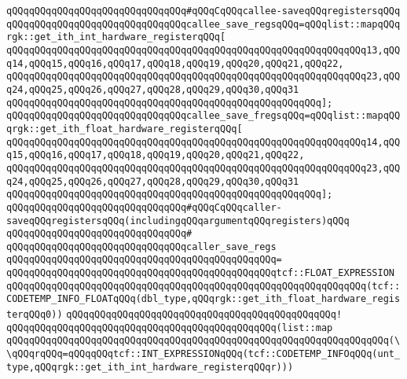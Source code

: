 \newline
\verb|qQQqqQQqqQQqqQQqqQQqqQQqqQQqqQQq#qQQqCqQQqcallee-saveqQQqregistersqQQq|\newline
\verb|qQQqqQQqqQQqqQQqqQQqqQQqqQQqqQQqcallee_save_regsqQQq=qQQqlist::mapqQQqrgk::get_ith_int_hardware_registerqQQq[|\newline
\verb|qQQqqQQqqQQqqQQqqQQqqQQqqQQqqQQqqQQqqQQqqQQqqQQqqQQqqQQqqQQqqQQq13,qQQq14,qQQq15,qQQq16,qQQq17,qQQq18,qQQq19,qQQq20,qQQq21,qQQq22,|\newline
\verb|qQQqqQQqqQQqqQQqqQQqqQQqqQQqqQQqqQQqqQQqqQQqqQQqqQQqqQQqqQQqqQQq23,qQQq24,qQQq25,qQQq26,qQQq27,qQQq28,qQQq29,qQQq30,qQQq31|\newline
\verb|qQQqqQQqqQQqqQQqqQQqqQQqqQQqqQQqqQQqqQQqqQQqqQQqqQQqqQQq];|\newline
\verb|qQQqqQQqqQQqqQQqqQQqqQQqqQQqqQQqcallee_save_fregsqQQq=qQQqlist::mapqQQqrgk::get_ith_float_hardware_registerqQQq[|\newline
\verb|qQQqqQQqqQQqqQQqqQQqqQQqqQQqqQQqqQQqqQQqqQQqqQQqqQQqqQQqqQQqqQQq14,qQQq15,qQQq16,qQQq17,qQQq18,qQQq19,qQQq20,qQQq21,qQQq22,|\newline
\verb|qQQqqQQqqQQqqQQqqQQqqQQqqQQqqQQqqQQqqQQqqQQqqQQqqQQqqQQqqQQqqQQq23,qQQq24,qQQq25,qQQq26,qQQq27,qQQq28,qQQq29,qQQq30,qQQq31|\newline
\verb|qQQqqQQqqQQqqQQqqQQqqQQqqQQqqQQqqQQqqQQqqQQqqQQqqQQqqQQq];|\newline
\newline
\verb|qQQqqQQqqQQqqQQqqQQqqQQqqQQqqQQq#qQQqCqQQqcaller-saveqQQqregistersqQQq(includingqQQqargumentqQQqregisters)qQQq|\newline
\verb|qQQqqQQqqQQqqQQqqQQqqQQqqQQqqQQq#|\newline
\verb|qQQqqQQqqQQqqQQqqQQqqQQqqQQqqQQqcaller_save_regs|\newline
\verb|qQQqqQQqqQQqqQQqqQQqqQQqqQQqqQQqqQQqqQQqqQQqqQQq=|\newline
\verb|qQQqqQQqqQQqqQQqqQQqqQQqqQQqqQQqqQQqqQQqqQQqqQQqtcf::FLOAT_EXPRESSION|\newline
\verb|qQQqqQQqqQQqqQQqqQQqqQQqqQQqqQQqqQQqqQQqqQQqqQQqqQQqqQQqqQQqqQQq(tcf::CODETEMP_INFO_FLOATqQQq(dbl_type,qQQqrgk::get_ith_float_hardware_registerqQQq0))|\newline
\verb|qQQqqQQqqQQqqQQqqQQqqQQqqQQqqQQqqQQqqQQqqQQqqQQq!|\newline
\verb|qQQqqQQqqQQqqQQqqQQqqQQqqQQqqQQqqQQqqQQqqQQqqQQq(list::map|\newline
\verb|qQQqqQQqqQQqqQQqqQQqqQQqqQQqqQQqqQQqqQQqqQQqqQQqqQQqqQQqqQQqqQQqqQQq(\\qQQqrqQQq=qQQqqQQqtcf::INT_EXPRESSIONqQQq(tcf::CODETEMP_INFOqQQq(unt_type,qQQqrgk::get_ith_int_hardware_registerqQQqr)))|\newline

